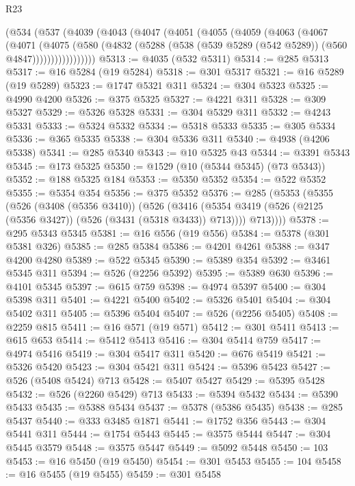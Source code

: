 \begin{lexlean}{R23}
\begin{coremodule}
    (@534
      (@537
        (@4039
          (@4043
            (@4047
              (@4051
                (@4055
                  (@4059
                    (@4063
                      (@4067
                        (@4071
                          (@4075
                            (@580
                              (@4832
                                (@5288 (@538 (@539 @5289 (@542 @5289)) (@560 @4847)))))))))))))))))
@5313 := @4035 (@532 @5311)
@5314 := @285 @5313
@5317 := @16 @5284 (@19 @5284)
@5318 := @301 @5317
@5321 := @16 @5289 (@19 @5289)
@5323 := @1747 @5321 @311
@5324 := @304 @5323
@5325 := @4990 @4200
@5326 := @375 @5325
@5327 := @4221 @311
@5328 := @309 @5327
@5329 := @5326 @5328
@5331 := @304 @5329 @311
@5332 := @4243 @5331
@5333 := @5324 @5332
@5334 := @5318 @5333
@5335 := @305 @5334
@5336 := @365 @5335
@5338 := @304 @5336 @311
@5340 := @4938 (@4206 @5338)
@5341 := @285 @5340
@5343 := @10 @5325 @43
@5344 := @3391 @5343
@5345 := @173 @5325
@5350 := @1529 (@10 (@5344 @5345) (@73 @5343))
@5352 := @188 @5325 @184
@5353 := @5350 @5352
@5354 := @522 @5352
@5355 := @5354 @354
@5356 := @375 @5352
@5376 := @285
    (@5353
      (@5355
        (@526
          (@3408 (@5356 @3410))
          (@526
            (@3416 (@5354 @3419 (@526 (@2125 (@5356 @3427)) (@526 (@3431 (@5318 @3433)) @713))))
            @713))))
@5378 := @295 @5343 @5345
@5381 := @16 @556 (@19 @556)
@5384 := @5378 (@301 @5381 @326)
@5385 := @285 @5384
@5386 := @4201 @4261
@5388 := @347 @4200 @4280
@5389 := @522 @5345
@5390 := @5389 @354
@5392 := @3461 @5345 @311
@5394 := @526 (@2256 @5392)
@5395 := @5389 @630
@5396 := @4101 @5345
@5397 := @615 @759
@5398 := @4974 @5397
@5400 := @304 @5398 @311
@5401 := @4221 @5400
@5402 := @5326 @5401
@5404 := @304 @5402 @311
@5405 := @5396 @5404
@5407 := @526 (@2256 @5405)
@5408 := @2259 @815
@5411 := @16 @571 (@19 @571)
@5412 := @301 @5411
@5413 := @615 @653
@5414 := @5412 @5413
@5416 := @304 @5414 @759
@5417 := @4974 @5416
@5419 := @304 @5417 @311
@5420 := @676 @5419
@5421 := @5326 @5420
@5423 := @304 @5421 @311
@5424 := @5396 @5423
@5427 := @526 (@5408 @5424) @713
@5428 := @5407 @5427
@5429 := @5395 @5428
@5432 := @526 (@2260 @5429) @713
@5433 := @5394 @5432
@5434 := @5390 @5433
@5435 := @5388 @5434
@5437 := @5378 (@5386 @5435)
@5438 := @285 @5437
@5440 := @333 @3485 @1871
@5441 := @1752 @356
@5443 := @304 @5441 @311
@5444 := @1754 @5443
@5445 := @3575 @5444
@5447 := @304 @5445 @3579
@5448 := @3575 @5447
@5449 := @5092 @5448
@5450 := 103
@5453 := @16 @5450 (@19 @5450)
@5454 := @301 @5453
@5455 := 104
@5458 := @16 @5455 (@19 @5455)
@5459 := @301 @5458

\end{coremodule}
\end{lexlean}
